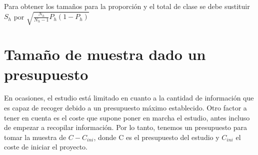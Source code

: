 \begin{table}[H]
\centering
{}
\caption{Tamaños de muestra con afijación óptima en el muestreo con reemplazamiento}
\end{table}

Para obtener los tamaños para la proporción y el total de clase se debe sustituir $S_h$ por $\sqrt{\frac{N_h}{N_h-1}P_h(1-P_h)}$


\section{Tamaño de muestra dado un presupuesto} \label{sect:4.5}
En ocasiones, el estudio está limitado en cuanto a la cantidad de información que es capaz de recoger debido a un presupuesto máximo establecido. Otro factor a tener en cuenta es el coste que supone poner en marcha el estudio, antes incluso de empezar a recopilar información. Por lo tanto, tenemos un presupuesto para tomar la muestra de $C-C_{ini}$, donde C es el presupuesto del estudio y $C_{ini}$ el coste de iniciar el proyecto.\\

